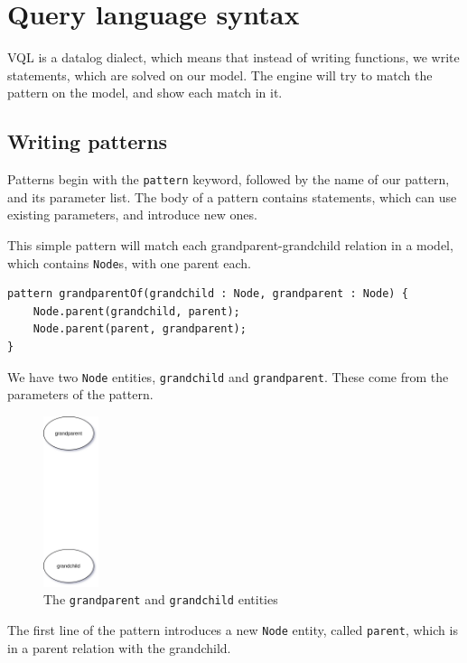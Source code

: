 \documentclass[11pt,a4paper,oneside]{report}
\begin{document}
\section{Query language syntax}
VQL is a datalog dialect, which means that instead of writing functions, we
write statements, which are solved on our model. The engine will try to match
the pattern on the model, and show each match in it.

\subsection{Writing patterns}
Patterns begin with the \texttt{pattern} keyword, followed by the name of our
pattern, and its parameter list. The body of a pattern contains statements,
which can use existing parameters, and introduce new ones.

This simple pattern will match each grandparent-grandchild relation in a model,
which contains \texttt{Node}s, with one parent each.

\begin{lstlisting}[caption={Grandparent-grandchild relation for \texttt{Node}s}, frame=single]
pattern grandparentOf(grandchild : Node, grandparent : Node) {
    Node.parent(grandchild, parent);
    Node.parent(parent, grandparent);
}
\end{lstlisting}

We have two \texttt{Node} entities, \texttt{grandchild} and
\texttt{grandparent}. These come from the parameters of the pattern.

\begin{figure}[!htbp]
\centering
\includegraphics[height=50mm, keepaspectratio]{figures/basic-pattern-explanation-1.png}
\caption{The \texttt{grandparent} and \texttt{grandchild} entities}
\label{fig:basic-pattern-explanation-1}
\end{figure}

The first line of the pattern introduces a new \texttt{Node} entity, called
\texttt{parent}, which is in a parent relation with the grandchild.
\end{document}
